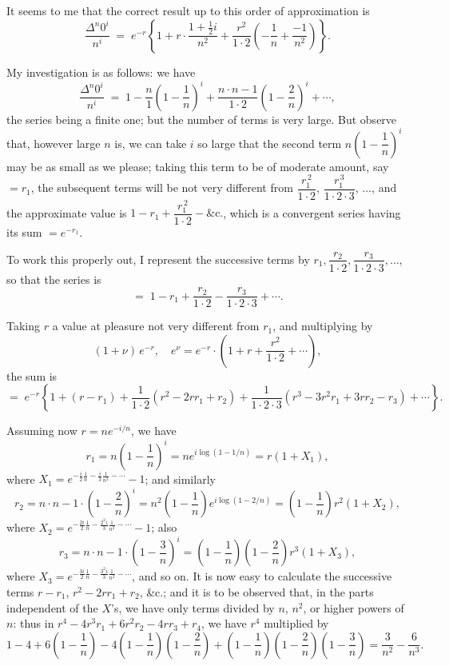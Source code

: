 \documentclass[11pt]{article}
\begin{document}
It seems to me that the correct result up to this order of approximation is
\[
\frac{\Delta^n 0^i}{n^i} \;=\; e^{-r}\!\left\{1 + r\!\cdot\!\frac{1+\tfrac{1}{2}i}{n^2} + \frac{r^2}{1\cdot 2}\!\left(-\frac{1}{n}+\frac{-1}{n^2}\right)\right\}.
\]

My investigation is as follows: we have
\[
\frac{\Delta^n 0^i}{n^i} \;=\; 1 - \frac{n}{1}\!\left(1-\frac{1}{n}\right)^{\!i} + \frac{n\cdot n-1}{1\cdot 2}\!\left(1-\frac{2}{n}\right)^{\!i} + \cdots,
\]
the series being a finite one; but the number of terms is very large. But observe that, however large $n$ is, we can take $i$ so large that the second term $n\!\left(1-\dfrac{1}{n}\right)^{\!i}$ may be as small as we please; taking this term to be of moderate amount, say $= r_1$, the subsequent terms will be not very different from $\dfrac{r_1^{\,2}}{1\cdot 2}$, $\dfrac{r_1^{\,3}}{1\cdot 2\cdot 3}$, $\ldots$, and the approximate value is $1 - r_1 + \dfrac{r_1^{\,2}}{1\cdot 2} - \&\text{c.}$, which is a convergent series having its sum $=e^{-r_1}$.

To work this properly out, I represent the successive terms by $r_1, \dfrac{r_2}{1\cdot 2}, \dfrac{r_3}{1\cdot 2\cdot 3},\ldots$, so that the series is
\[
=\; 1 - r_1 + \frac{r_2}{1\cdot 2} - \frac{r_3}{1\cdot 2\cdot 3} + \cdots.
\]

Taking $r$ a value at pleasure not very different from $r_1$, and multiplying by
\[
(1+\nu)\,e^{-r},\quad e^{\nu} = e^{-r}\!\cdot\!\left(1+r+\frac{r^2}{1\cdot 2}+\cdots\right),
\]
the sum is
\[
=\; e^{-r}\!\left\{1+(r-r_1)+\frac{1}{1\cdot 2}(r^2-2rr_1+r_2)+\frac{1}{1\cdot 2\cdot 3}(r^3-3r^2r_1+3rr_2-r_3)+\cdots\right\}.
\]

Assuming now $r=ne^{-i/n}$, we have
\[
r_1 = n\!\left(1-\frac{1}{n}\right)^{\!i} = ne^{i\log(1-1/n)} = r(1+X_1),
\]
where $X_1 = e^{-\tfrac{i}{2}\frac{1}{n}-\tfrac{i}{3}\frac{1}{n^2}-\cdots}-1$; and similarly
\[
r_2 = n\!\cdot\!n{-}1\!\cdot\!\left(1-\frac{2}{n}\right)^{\!i} = n^2\!\left(1-\frac{1}{n}\right)\!e^{i\log(1-2/n)} = \left(1-\frac{1}{n}\right)r^2(1+X_2),
\]
where $X_2 = e^{-\tfrac{2i}{2}\frac{1}{n}-\tfrac{2^2 i}{3}\frac{1}{n^2}-\cdots}-1$; also
\[
r_3 = n\!\cdot\!n{-}1\!\cdot\!\left(1-\frac{3}{n}\right)^{\!i} = \left(1-\frac{1}{n}\right)\!\left(1-\frac{2}{n}\right)\!r^3(1+X_3),
\]
where $X_3 = e^{-\tfrac{3i}{2}\frac{1}{n}-\tfrac{3^2 i}{3}\frac{1}{n^2}-\cdots}$, and so on. It is now easy to calculate the successive terms $r-r_1$, $r^2-2rr_1+r_2$, \&c.; and it is to be observed that, in the parts independent of the $X$'s, we have only terms divided by $n$, $n^2$, or higher powers of $n$: thus in $r^4-4r^3 r_1 + 6r^2 r_2 - 4r r_3 + r_4$, we have $r^4$ multiplied by
\[
1 - 4 + 6\!\left(1-\frac{1}{n}\right) - 4\!\left(1-\frac{1}{n}\right)\!\left(1-\frac{2}{n}\right) + \left(1-\frac{1}{n}\right)\!\left(1-\frac{2}{n}\right)\!\left(1-\frac{3}{n}\right) = \frac{3}{n^2}-\frac{6}{n^3}.
\]
\end{document}
